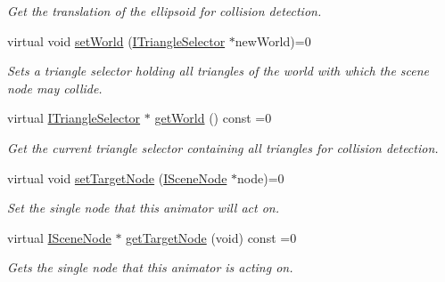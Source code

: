 \begin{DoxyCompactItemize}
\begin{DoxyCompactList}\small\item\em Get the translation of the ellipsoid for collision detection. \end{DoxyCompactList}\item 
virtual void \hyperlink{classirr_1_1scene_1_1ISceneNodeAnimatorCollisionResponse_a42aa84d4843a734f8dd1f20b5c92ef06}{set\+World} (\hyperlink{classirr_1_1scene_1_1ITriangleSelector}{I\+Triangle\+Selector} $\ast$new\+World)=0
\begin{DoxyCompactList}\small\item\em Sets a triangle selector holding all triangles of the world with which the scene node may collide. \end{DoxyCompactList}\item 
\mbox{\label{classirr_1_1scene_1_1ISceneNodeAnimatorCollisionResponse_a58e106171ca57a4877d7a6f0edd9762f}} 
virtual \hyperlink{classirr_1_1scene_1_1ITriangleSelector}{I\+Triangle\+Selector} $\ast$ \hyperlink{classirr_1_1scene_1_1ISceneNodeAnimatorCollisionResponse_a58e106171ca57a4877d7a6f0edd9762f}{get\+World} () const =0
\begin{DoxyCompactList}\small\item\em Get the current triangle selector containing all triangles for collision detection. \end{DoxyCompactList}\item 
virtual void \hyperlink{classirr_1_1scene_1_1ISceneNodeAnimatorCollisionResponse_a5b291ba9249c451779f76ab2154aa3c2}{set\+Target\+Node} (\hyperlink{classirr_1_1scene_1_1ISceneNode}{I\+Scene\+Node} $\ast$node)=0
\begin{DoxyCompactList}\small\item\em Set the single node that this animator will act on. \end{DoxyCompactList}\item 
virtual \hyperlink{classirr_1_1scene_1_1ISceneNode}{I\+Scene\+Node} $\ast$ \hyperlink{classirr_1_1scene_1_1ISceneNodeAnimatorCollisionResponse_a11b1c54ec705f4ba8b0bb3facb0f09cb}{get\+Target\+Node} (void) const =0
\begin{DoxyCompactList}\small\item\em Gets the single node that this animator is acting on. \end{DoxyCompactList}\item 
\mbox{\label{classirr_1_1scene_1_1ISceneNodeAnimatorCollisionResponse_a8bb04bc4d7de2203879a8392d024f466}} 

\end{DoxyCompactItemize}

